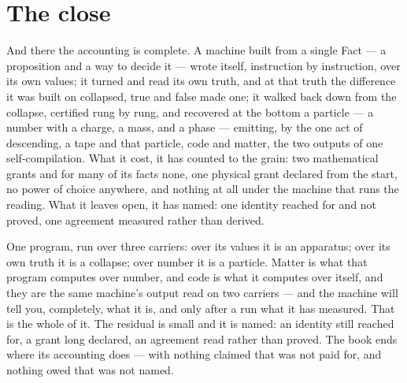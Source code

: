 \section{The close}
\label{se:the-close}

And there the accounting is complete. A machine built from a single Fact --- a proposition and a way to
decide it --- wrote itself, instruction by instruction, over its own values; it turned and read its own
truth, and at that truth the difference it was built on collapsed, true and false made one; it walked back
down from the collapse, certified rung by rung, and recovered at the bottom a particle --- a number with a
charge, a mass, and a phase --- emitting, by the one act of descending, a tape and that particle, code and
matter, the two outputs of one self-compilation. What it cost, it has counted to the grain: two mathematical
grants and for many of its facts none, one physical grant declared from the start, no power of choice
anywhere, and nothing at all under the machine that runs the reading. What it leaves open, it has named: one
identity reached for and not proved, one agreement measured rather than derived.

One program, run over three carriers: over its values it is an apparatus; over its own truth it is a
collapse; over number it is a particle. Matter is what that program computes over number, and code is what it
computes over itself, and they are the same machine's output read on two carriers --- and the machine will
tell you, completely, what it is, and only after a run what it has measured. That is the whole of it. The
residual is small and it is named: an identity still reached for, a grant long declared, an agreement read
rather than proved. The book ends where its accounting does --- with nothing claimed that was not paid for,
and nothing owed that was not named.
